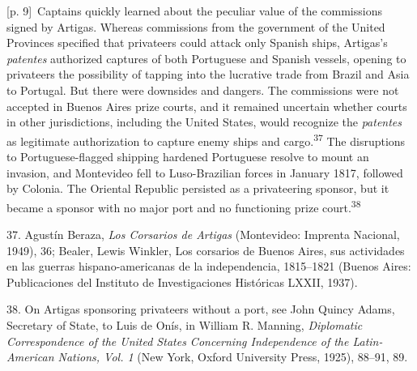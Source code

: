 \documentclass[10pt,a4paper]{article}
\begin{document}
{\scriptsize\color{gray} [p. 9]}\ Captains quickly learned about the peculiar value of the commissions signed by Artigas. Whereas commissions from the government of the United Provinces specified that privateers could attack only Spanish ships, Artigas’s \textit{patentes} authorized captures of both Portuguese and Spanish vessels, opening to privateers the possibility of tapping into the lucrative trade from Brazil and Asia to Portugal. But there were downsides and dangers. The commissions were not accepted in Buenos Aires prize courts, and it remained uncertain whether courts in other jurisdictions, including the United States, would recognize the \textit{patentes} as legitimate authorization to capture enemy ships and cargo.\nobreak\textsuperscript{37} The disruptions to Portuguese-flagged shipping hardened Portuguese resolve to mount an invasion, and Montevideo fell to Luso-Brazilian forces in January 1817, followed by Colonia. The Oriental Republic persisted as a privateering sponsor, but it became a sponsor with no major port and no functioning prize court.\nobreak\textsuperscript{38}\par{\small 37. Agustín Beraza, \textit{Los Corsarios de Artigas} (Montevideo: Imprenta Nacional, 1949), 36; Bealer, Lewis Winkler, Los corsarios de Buenos Aires, sus actividades en las guerras hispano-americanas de la independencia, 1815–1821 (Buenos Aires: Publicaciones del Instituto de Investigaciones Históricas LXXII, 1937).\par}{\small 38. On Artigas sponsoring privateers without a port, see John Quincy Adams, Secretary of State, to Luis de Onís, in William R. Manning, \textit{Diplomatic Correspondence of the United States Concerning Independence of the Latin-American Nations, Vol. 1} (New York, Oxford University Press, 1925), 88–91, 89.\par}
\end{document}
